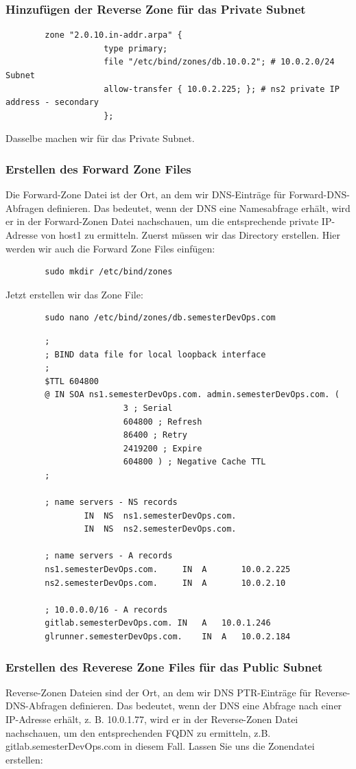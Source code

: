 \documentclass[a4paper,12pt]{article}
\begin{document}
\subsubsection{Hinzufügen der Reverse Zone für das Private Subnet}
\begin{verbatim}
		zone "2.0.10.in-addr.arpa" {
					type primary;
					file "/etc/bind/zones/db.10.0.2"; # 10.0.2.0/24 Subnet
					allow-transfer { 10.0.2.225; }; # ns2 private IP address - secondary
					};
\end{verbatim}
Dasselbe machen wir für das Private Subnet.

\subsubsection{Erstellen des Forward Zone Files}
Die Forward-Zone Datei ist der Ort, an dem wir DNS-Einträge für Forward-DNS-Abfragen definieren. 
Das bedeutet, wenn der DNS eine Namesabfrage erhält, wird er in der Forward-Zonen Datei nachschauen, um die entsprechende private IP-Adresse von host1 zu ermitteln.
Zuerst müssen wir das Directory erstellen. Hier werden wir auch die Forward Zone Files einfügen:
\begin{verbatim}
		sudo mkdir /etc/bind/zones
\end{verbatim}
Jetzt erstellen wir das Zone File:
\begin{verbatim}
		sudo nano /etc/bind/zones/db.semesterDevOps.com
\end{verbatim}

\begin{verbatim}
		;
		; BIND data file for local loopback interface
		;
		$TTL 604800
		@ IN SOA ns1.semesterDevOps.com. admin.semesterDevOps.com. (
						3 ; Serial
						604800 ; Refresh
						86400 ; Retry
						2419200 ; Expire
						604800 ) ; Negative Cache TTL
		;

		; name servers - NS records
				IN	NS 	ns1.semesterDevOps.com.
				IN 	NS 	ns2.semesterDevOps.com.

		; name servers - A records
		ns1.semesterDevOps.com. 	IN	A		10.0.2.225
		ns2.semesterDevOps.com. 	IN	A		10.0.2.10

		; 10.0.0.0/16 - A records
		gitlab.semesterDevOps.com. IN 	A 	10.0.1.246
		glrunner.semesterDevOps.com. 	IN 	A 	10.0.2.184
\end{verbatim}


\subsubsection{Erstellen des Reverese Zone Files für das Public Subnet}
Reverse-Zonen Dateien sind der Ort, an dem wir DNS PTR-Einträge für Reverse-DNS-Abfragen definieren. 
Das bedeutet, wenn der DNS eine Abfrage nach einer IP-Adresse erhält, z. B. 10.0.1.77, wird er in der Reverse-Zonen Datei nachschauen, um den entsprechenden FQDN zu ermitteln, z.B. gitlab.semesterDevOps.com in diesem Fall.
Lassen Sie uns die Zonendatei erstellen:
\end{document}
